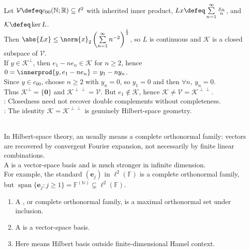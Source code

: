\begin{example} \label{ex:closed-subspace-double-complement-can-fail-without-completeness} \\
Let $\mathcal{V}\defeq c_{00}(\mathbb{N};\mathbb{R})\subseteq\ell^2$ with inherited inner product, $Lx\defeq\sum\limits_{n=1}^{\infty}\frac{x_n}{n}$, and $\mathcal{K}\defeq\ker L$.\\
Then $\abs{Lx}\leq\norm{x}_2\left(\sum\limits_{n=1}^{\infty}n^{-2}\right)^{\frac{1}{2}}$, so $L$ is continuous and $\mathcal{K}$ is a closed subspace of $\mathcal{V}$.\\
If $y\in\mathcal{K}^{\perp}$, then $e_1-ne_n\in\mathcal{K}$ for $n\geq2$, hence $0=\innerprod{y,e_1-ne_n}=y_1-ny_n$.\\
Since $y\in c_{00}$, choose $n\geq2$ with $y_n=0$, so $y_1=0$ and then $\forall n,\ y_n=0$.\\
Thus $\mathcal{K}^{\perp}=\{\mathbf{0}\}$ and $\mathcal{K}^{\perp\perp}=\mathcal{V}$. But $e_1\notin\mathcal{K}$, hence $\mathcal{K}\neq\mathcal{V}=\mathcal{K}^{\perp\perp}$.\\
: Closedness need not recover double complements without completeness.\\
: The identity $\mathcal{K}=\mathcal{K}^{\perp\perp}$ is genuinely Hilbert-space geometry.
\end{example}

\begin{perspective} \label{per:hamel-hilbert-basis-warning} \\
In Hilbert-space theory, an  usually means a complete orthonormal family: vectors are recovered by convergent Fourier expansion, not necessarily by finite linear combinations.\\
A  is a vector-space basis and is much stronger in infinite dimension.\\
For example, the standard $(\mathbf{e}_j)$ in $\ell^2(\mathbb{F})$ is a complete orthonormal family, but $\operatorname{span}\{\mathbf{e}_j:j\geq1\}=\mathbb{F}^{(\mathbb{N})}\subsetneq\ell^2(\mathbb{F})$.
\end{perspective}

\begin{definition} \label{def:hilbert-basis-versus-hamel-basis} 
\begin{enumerate}[label=(\roman*)]
\setlength{\itemsep}{0pt}
\item A , or complete orthonormal family, is a maximal orthonormal set under inclusion.
\item A  is a vector-space basis.
\item Here  means Hilbert basis outside finite-dimensional Hamel context.
\end{enumerate}
\end{definition}

